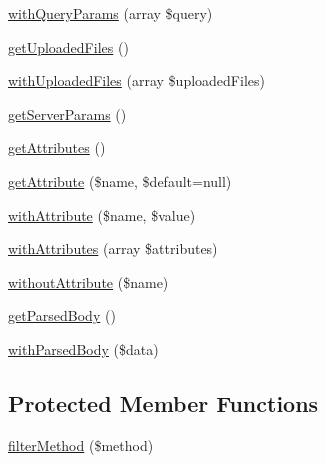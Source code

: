 \begin{DoxyCompactItemize}
\mbox{\hyperlink{class_pes_1_1_http_1_1_request_a2d8091f3537004c1a0241c00f0612cd3}{with\+Query\+Params}} (array \$query)
\item 
\mbox{\hyperlink{class_pes_1_1_http_1_1_request_a37e4a06ea2cd48bddfd2d86e127394c6}{get\+Uploaded\+Files}} ()
\item 
\mbox{\hyperlink{class_pes_1_1_http_1_1_request_a74e948aa5aa4eaccb08debcf9ff989b0}{with\+Uploaded\+Files}} (array \$uploaded\+Files)
\item 
\mbox{\hyperlink{class_pes_1_1_http_1_1_request_abe2174960ca9d241f83fabd7d2dd8e84}{get\+Server\+Params}} ()
\item 
\mbox{\hyperlink{class_pes_1_1_http_1_1_request_afbe85ec4b9947cc951c67d63911cf0a4}{get\+Attributes}} ()
\item 
\mbox{\hyperlink{class_pes_1_1_http_1_1_request_a40e8ccedfa17d0219e2e21e96968ed66}{get\+Attribute}} (\$name, \$default=null)
\item 
\mbox{\hyperlink{class_pes_1_1_http_1_1_request_a198860db2088101b62e531a1db45aa5b}{with\+Attribute}} (\$name, \$value)
\item 
\mbox{\hyperlink{class_pes_1_1_http_1_1_request_a812202259b9a1683a64bb699ef988dd5}{with\+Attributes}} (array \$attributes)
\item 
\mbox{\hyperlink{class_pes_1_1_http_1_1_request_af72260a94d2ebbc771a53ba854ae1863}{without\+Attribute}} (\$name)
\item 
\mbox{\hyperlink{class_pes_1_1_http_1_1_request_adf5a4f6e03b33e876c065ca9a1409f38}{get\+Parsed\+Body}} ()
\item 
\mbox{\hyperlink{class_pes_1_1_http_1_1_request_a1ec2d8653dc9bb73297657ce57ce14d6}{with\+Parsed\+Body}} (\$data)
\end{DoxyCompactItemize}
\subsection*{Protected Member Functions}
\begin{DoxyCompactItemize}
\item 
\mbox{\hyperlink{class_pes_1_1_http_1_1_request_a53898ae51d98cbd7a413a0f2d348781e}{filter\+Method}} (\$method)
\end{DoxyCompactItemize}

